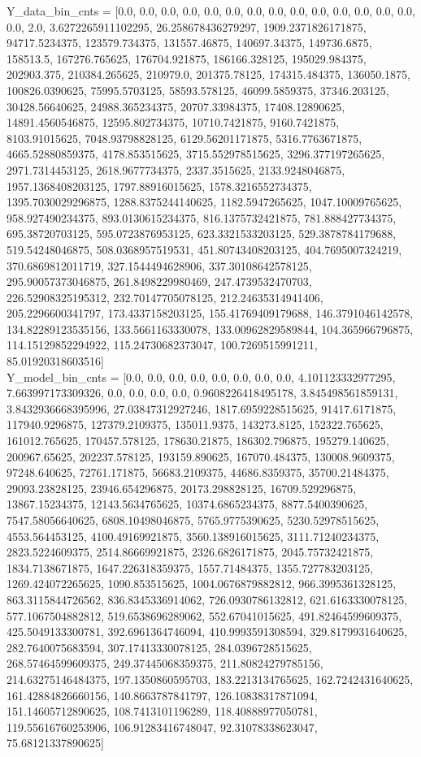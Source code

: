 \documentclass[12pt]{article}
\begin{document}
	Y\_data\_bin\_cnts = [0.0, 0.0, 0.0, 0.0, 0.0, 0.0, 0.0, 0.0, 0.0, 0.0, 0.0, 0.0, 0.0, 0.0, 0.0, 2.0, 3.6272265911102295, 26.258678436279297, 1909.2371826171875, 94717.5234375, 123579.734375, 131557.46875, 140697.34375, 149736.6875, 158513.5, 167276.765625, 176704.921875, 186166.328125, 195029.984375, 202903.375, 210384.265625, 210979.0, 201375.78125, 174315.484375, 136050.1875, 100826.0390625, 75995.5703125, 58593.578125, 46099.5859375, 37346.203125, 30428.56640625, 24988.365234375, 20707.33984375, 17408.12890625, 14891.4560546875, 12595.802734375, 10710.7421875, 9160.7421875, 8103.91015625, 7048.93798828125, 6129.56201171875, 5316.7763671875, 4665.52880859375, 4178.853515625, 3715.552978515625, 3296.377197265625, 2971.7314453125, 2618.9677734375, 2337.3515625, 2133.9248046875, 1957.1368408203125, 1797.88916015625, 1578.3216552734375, 1395.7030029296875, 1288.8375244140625, 1182.5947265625, 1047.10009765625, 958.927490234375, 893.0130615234375, 816.1375732421875, 781.888427734375, 695.38720703125, 595.0723876953125, 623.3321533203125, 529.3878784179688, 519.54248046875, 508.0368957519531, 451.80743408203125, 404.7695007324219, 370.6869812011719, 327.1544494628906, 337.30108642578125, 295.90057373046875, 261.8498229980469, 247.4739532470703, 226.52908325195312, 232.70147705078125, 212.24635314941406, 205.2296600341797, 173.4337158203125, 155.41769409179688, 146.3791046142578, 134.82289123535156, 133.5661163330078, 133.00962829589844, 104.365966796875, 114.15129852294922, 115.24730682373047, 100.7269515991211, 85.01920318603516]\\
	Y\_model\_bin\_cnts = [0.0, 0.0, 0.0, 0.0, 0.0, 0.0, 0.0, 0.0, 4.101123332977295, 7.663997173309326, 0.0, 0.0, 0.0, 0.0, 0.9608226418495178, 3.845498561859131, 3.8432936668395996, 27.03847312927246, 1817.6959228515625, 91417.6171875, 117940.9296875, 127379.2109375, 135011.9375, 143273.8125, 152322.765625, 161012.765625, 170457.578125, 178630.21875, 186302.796875, 195279.140625, 200967.65625, 202237.578125, 193159.890625, 167070.484375, 130008.9609375, 97248.640625, 72761.171875, 56683.2109375, 44686.8359375, 35700.21484375, 29093.23828125, 23946.654296875, 20173.298828125, 16709.529296875, 13867.15234375, 12143.5634765625, 10374.6865234375, 8877.5400390625, 7547.58056640625, 6808.10498046875, 5765.9775390625, 5230.52978515625, 4553.564453125, 4100.49169921875, 3560.138916015625, 3111.71240234375, 2823.5224609375, 2514.86669921875, 2326.6826171875, 2045.75732421875, 1834.7138671875, 1647.226318359375, 1557.71484375, 1355.727783203125, 1269.424072265625, 1090.853515625, 1004.0676879882812, 966.3995361328125, 863.3115844726562, 836.8345336914062, 726.0930786132812, 621.6163330078125, 577.1067504882812, 519.6538696289062, 552.67041015625, 491.82464599609375, 425.5049133300781, 392.6961364746094, 410.9993591308594, 329.8179931640625, 282.7640075683594, 307.17413330078125, 284.0396728515625, 268.57464599609375, 249.37445068359375, 211.80824279785156, 214.63275146484375, 197.1350860595703, 183.2213134765625, 162.7242431640625, 161.42884826660156, 140.8663787841797, 126.10838317871094, 151.14605712890625, 108.7413101196289, 118.40888977050781, 119.55616760253906, 106.91283416748047, 92.31078338623047, 75.68121337890625]\\
\end{document}
